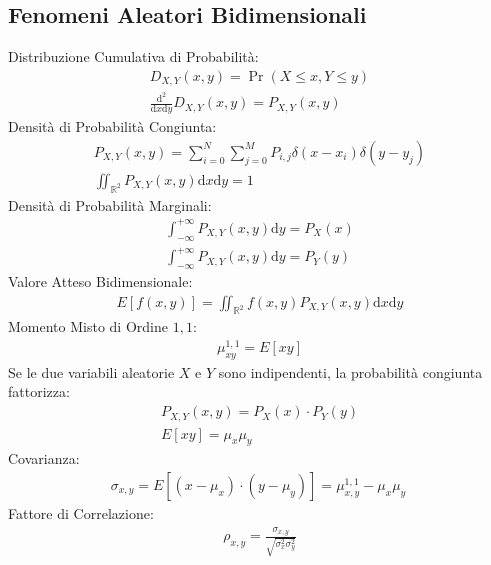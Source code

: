 \documentclass{article}
\newcommand{\df}{\mathrm{d}}
\newcommand{\intinf}{\displaystyle\int_{-\infty}^{+\infty}}
\begin{document}
\subsection*{Fenomeni Aleatori Bidimensionali}
Distribuzione Cumulativa di Probabilità:
\begin{gather*}
    D_{X,Y}(x,y)=\Pr(X\leq x,Y\leq y)\\
    \displaystyle\frac{\df^2}{\df x\df y}D_{X,Y}(x,y)=P_{X,Y}(x,y)
\end{gather*}
Densità di Probabilità Congiunta:
\begin{gather*}
    P_{X,Y}(x,y)=\displaystyle\sum_{i=0}^N\sum_{j=0}^MP_{i,j}\delta(x-x_i)\delta(y-y_j)\\
    \iint_{\mathbb{R}^2}P_{X,Y}(x,y)\df x\df y=1
\end{gather*}
Densità di Probabilità Marginali:
\begin{gather*}
    \intinf P_{X,Y}(x,y)\df y=P_X(x)\\
    \intinf P_{X,Y}(x,y)\df y=P_Y(y)
\end{gather*}
Valore Atteso Bidimensionale:
\begin{gather*}
    E[f(x,y)]=\iint_{\mathbb{R}^2}f(x,y)P_{X,Y}(x,y)\df x\df y
\end{gather*}
Momento Misto di Ordine $1,1$:
\begin{gather*}
    \mu_{xy}^{1,1}=E[xy]
\end{gather*}
Se le due variabili aleatorie $X$ e $Y$ sono indipendenti, la probabilità congiunta fattorizza:
\begin{gather*}
    P_{X,Y}(x,y)=P_X(x)\cdot P_Y(y)\\
    E[xy]=\mu_x\mu_y
\end{gather*}
Covarianza:
\begin{gather*}
    \sigma_{x,y}=E[(x-\mu_x)\cdot(y-\mu_y)]=\mu_{x,y}^{1,1}-\mu_x\mu_y\
\end{gather*}
Fattore di Correlazione:
\begin{gather*}
    \rho_{x,y}=\displaystyle\frac{\sigma_{x,y}}{\sqrt{\sigma_x^2\sigma_y^2}}
\end{gather*}
\end{document}
